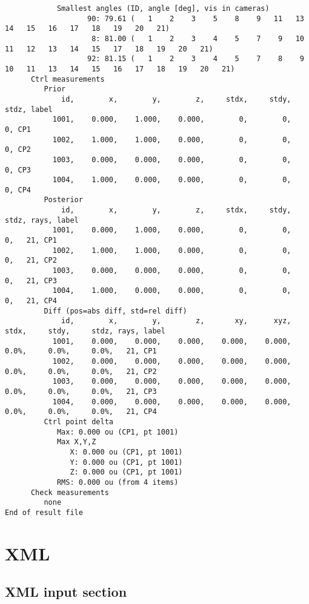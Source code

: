\documentclass{article}
\begin{document}
\begin{verbatim}
            Smallest angles (ID, angle [deg], vis in cameras)
                   90: 79.61 (   1    2    3    5    8    9   11   13   14   15   16   17   18   19   20   21)
                    8: 81.00 (   1    2    3    4    5    7    9   10   11   12   13   14   15   17   18   19   20   21)
                   92: 81.15 (   1    2    3    4    5    7    8    9   10   11   13   14   15   16   17   18   19   20   21)
      Ctrl measurements
         Prior
             id,        x,        y,        z,     stdx,     stdy,     stdz, label
           1001,    0.000,    1.000,    0.000,        0,        0,        0, CP1
           1002,    1.000,    1.000,    0.000,        0,        0,        0, CP2
           1003,    0.000,    0.000,    0.000,        0,        0,        0, CP3
           1004,    1.000,    0.000,    0.000,        0,        0,        0, CP4
         Posterior
             id,        x,        y,        z,     stdx,     stdy,     stdz, rays, label
           1001,    0.000,    1.000,    0.000,        0,        0,        0,   21, CP1
           1002,    1.000,    1.000,    0.000,        0,        0,        0,   21, CP2
           1003,    0.000,    0.000,    0.000,        0,        0,        0,   21, CP3
           1004,    1.000,    0.000,    0.000,        0,        0,        0,   21, CP4
         Diff (pos=abs diff, std=rel diff)
             id,        x,        y,        z,       xy,      xyz,     stdx,     stdy,     stdz, rays, label
           1001,    0.000,    0.000,    0.000,    0.000,    0.000,     0.0%,     0.0%,     0.0%,   21, CP1
           1002,    0.000,    0.000,    0.000,    0.000,    0.000,     0.0%,     0.0%,     0.0%,   21, CP2
           1003,    0.000,    0.000,    0.000,    0.000,    0.000,     0.0%,     0.0%,     0.0%,   21, CP3
           1004,    0.000,    0.000,    0.000,    0.000,    0.000,     0.0%,     0.0%,     0.0%,   21, CP4
         Ctrl point delta
            Max: 0.000 ou (CP1, pt 1001)
            Max X,Y,Z
               X: 0.000 ou (CP1, pt 1001)
               Y: 0.000 ou (CP1, pt 1001)
               Z: 0.000 ou (CP1, pt 1001)
            RMS: 0.000 ou (from 4 items)
      Check measurements
         none
End of result file
\end{verbatim}

\newpage
\section{XML}
\label{sec:orgd3f7def}
\subsection{XML input section}
\label{sec:orgb2862fe}
\end{document}
